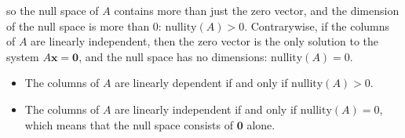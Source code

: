 \documentclass{article}
\begin{document}
so the null space of \(A\) contains more than just the zero vector, and the dimension of the null space is more than \(0\): \(\text{nullity}(A) > 0\). Contrarywise, if the columns of \(A\) are linearly independent, then the zero vector is the only solution to the system \(A\mathbf{x} = \mathbf{0}\), and the null space has no dimensions: \(\text{nullity}(A) = 0\).
\begin{itemize}
\item The columns of \(A\) are linearly dependent if and only if \(\text{nullity}(A) > 0\).
\item The columns of \(A\) are linearly independent if and only if \(\text{nullity}(A) = 0\), which means that the null space consists of \(\mathbf{0}\) alone.
\end{itemize}

\vspace{5mm}
\end{document}
